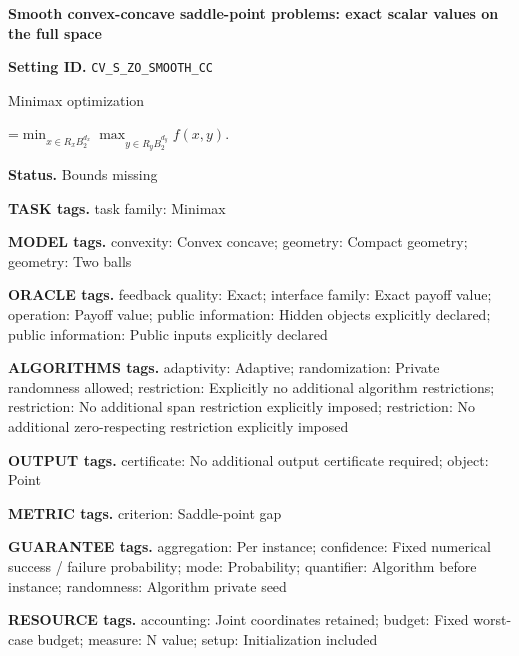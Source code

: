 \documentclass[10pt,a4paper]{article}
\newcommand{\AtlasMath}[1]{\par\begingroup\centering\setbox0=\hbox{$\displaystyle #1$}\ifdim\wd0>1.4\linewidth\typeout{ATLAS WIDE FORMULA: \the\wd0}\fi\ifdim\wd0>\linewidth\resizebox{\linewidth}{!}{\box0}\else\box0\fi\par\endgroup}
\begin{document}
\raggedright

{\LARGE\bfseries\sffamily\color{AtlasNavy} Smooth convex-concave saddle-point problems: exact scalar values on the full space\par}\vspace{5pt}


\textbf{Setting ID.} \texttt{CV\_\allowbreak{}S\_\allowbreak{}ZO\_\allowbreak{}SMOOTH\_\allowbreak{}CC}



Minimax optimization




\AtlasMath{\min_{x\in R_xB_2^{d_x}}\max_{y\in R_yB_2^{d_y}}f(x,y).}




\textbf{Status.} Bounds missing



\textbf{TASK tags.} task family: Minimax



\textbf{MODEL tags.} convexity: Convex concave; geometry: Compact geometry; geometry: Two balls



\textbf{ORACLE tags.} feedback quality: Exact; interface family: Exact payoff value; operation: Payoff value; public information: Hidden objects explicitly declared; public information: Public inputs explicitly declared



\textbf{ALGORITHMS tags.} adaptivity: Adaptive; randomization: Private randomness allowed; restriction: Explicitly no additional algorithm restrictions; restriction: No additional span restriction explicitly imposed; restriction: No additional zero-respecting restriction explicitly imposed



\textbf{OUTPUT tags.} certificate: No additional output certificate required; object: Point



\textbf{METRIC tags.} criterion: Saddle-point gap



\textbf{GUARANTEE tags.} aggregation: Per instance; confidence: Fixed numerical success / failure probability; mode: Probability; quantifier: Algorithm before instance; randomness: Algorithm private seed



\textbf{RESOURCE tags.} accounting: Joint coordinates retained; budget: Fixed worst-case budget; measure: N value; setup: Initialization included
\end{document}
